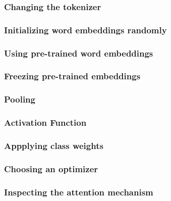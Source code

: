 \subsubsection{Changing the tokenizer}
\label{subsubsec:5_experiments/4_texter/2_static/1_tokenizer}


\subsubsection{Initializing word embeddings randomly}
\label{subsubsec:5_experiments/4_texter/2_static/2_emb_size}


\subsubsection{Using pre-trained word embeddings}
\label{subsubsec:5_experiments/4_texter/2_static/3_pre_trained}


\subsubsection{Freezing pre-trained embeddings}
\label{subsubsec:5_experiments/4_texter/2_static/4_update_vectors}


\subsubsection{Pooling}
\label{subsubsec:5_experiments/4_texter/2_static/5_pooling}


\subsubsection{Activation Function}
\label{subsubsec:5_experiments/4_texter/2_static/6_activation}


\subsubsection{Appplying class weights}
\label{subsubsec:5_experiments/4_texter/2_static/7_weight_factor}


\subsubsection{Choosing an optimizer}
\label{subsubsec:5_experiments/4_texter/2_static/8_optimizer}


\subsubsection{Inspecting the attention mechanism}
\label{subsubsec:5_experiments/4_texter/2_static/9_attention}

